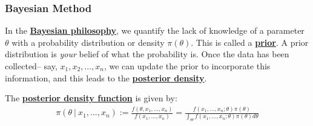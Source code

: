 \documentclass[11pt]{scrartcl}
\theoremstyle{definition}
\theoremstyle{remark}
\newcommand{\dfn}[1]{\textbf{\underline{#1}}}
\newcommand{\idx}[2]{\int_{#1}^{#2}}
\begin{document}
\subsubsection{Bayesian Method}
In the \dfn{Bayesian philosophy}, we quantify the lack of knowledge of a parameter $\theta$ with a probability distribution or density $\pi(\theta)$. This is called a \dfn{prior}. A prior distribution is \emph{your} belief of what the probability is. Once the data has been collected-- say, $x_1, x_2, ..., x_n$, we can update the prior to incorporate this information, and this leads to the \dfn{posterior density}. 

The \dfn{posterior density function} is given by: 
\begin{align}
	\pi (\theta\ |\ x_1, ..., x_n ) := \frac{f(\theta, x_1, ..., x_n)}{f(x_1,..., x_n)	} = \frac{f(x_1, ..., x_n; \theta) \pi(\theta)}{\idx{\Theta}{} f(x_1, ..., x_n; \theta) \pi(\theta) d \theta}
\end{align}
\end{document}
